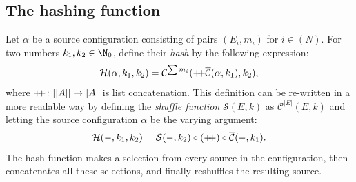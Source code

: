 \documentclass[12pt, a4paper]{article}
\renewcommand{\C}{\mathcal{C}}
\newcommand{\CC}{\overline{\mathcal{C}}}
\renewcommand{\H}{\mathcal{H}}
\renewcommand{\S}{\mathcal{S}}
\newcommand{\dop}{\mathbin{{+}\hspace{-1mm}{+}}}
\begin{document}
\subsection{The hashing function}

\begin{definition}
    Let $ \alpha $ be a source configuration consisting of pairs $ (E_i, m_i) $ for $ i \in (N) $. For two numbers $ k_1, k_2 \in \N_0 $, define their \emph{hash} by the following expression:
    \[ \H(\alpha, k_1, k_2) = \C^{\sum m_i}(\dop\CC(\alpha, k_1), k_2), \]
    where $ \dop \colon [[A]] \to [A] $ is list concatenation. This definition can be re-written in a more readable way by defining the \emph{shuffle function} $ \S(E, k) $ as $ \C^{|E|}(E, k) $ and letting the source configuration $ \alpha $ be the varying argument:
    \[ \H(-, k_1, k_2) = \S(-, k_2) \circ (\dop) \circ \CC(-, k_1). \]
    The hash function makes a selection from every source in the configuration, then concatenates all these selections, and finally reshuffles the resulting source.
\end{definition}
\end{document}
